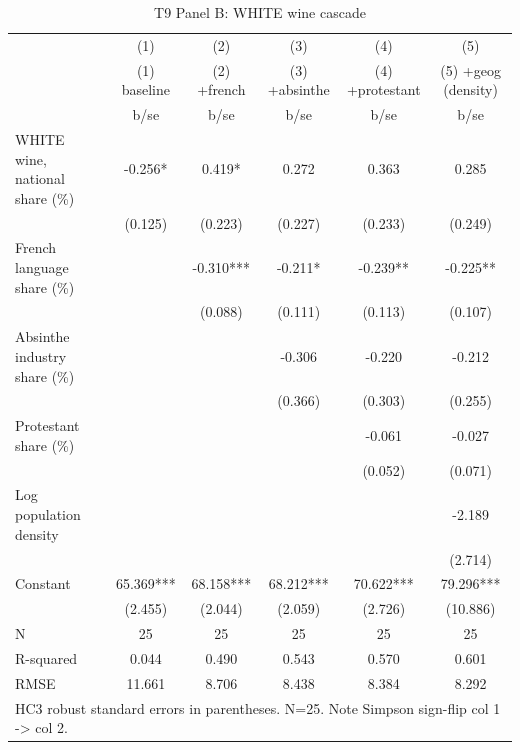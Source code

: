 \begin{table}[htbp]\centering
\def\sym#1{\ifmmode^{#1}\else\(^{#1}\)\fi}
\caption{T9 Panel B: WHITE wine cascade \label{tab:T9\_B}}
\begin{tabular}{l*{5}{c}}
\toprule
            &\multicolumn{1}{c}{(1)}&\multicolumn{1}{c}{(2)}&\multicolumn{1}{c}{(3)}&\multicolumn{1}{c}{(4)}&\multicolumn{1}{c}{(5)}\\
            &\multicolumn{1}{c}{(1) baseline}&\multicolumn{1}{c}{(2) +french}&\multicolumn{1}{c}{(3) +absinthe}&\multicolumn{1}{c}{(4) +protestant}&\multicolumn{1}{c}{(5) +geog (density)}\\
            &        b/se   &        b/se   &        b/se   &        b/se   &        b/se   \\
\midrule
WHITE wine, national share (\%)&      -0.256*  &       0.419*  &       0.272   &       0.363   &       0.285   \\
            &     (0.125)   &     (0.223)   &     (0.227)   &     (0.233)   &     (0.249)   \\
French language share (\%)&               &      -0.310***&      -0.211*  &      -0.239** &      -0.225** \\
            &               &     (0.088)   &     (0.111)   &     (0.113)   &     (0.107)   \\
Absinthe industry share (\%)&               &               &      -0.306   &      -0.220   &      -0.212   \\
            &               &               &     (0.366)   &     (0.303)   &     (0.255)   \\
Protestant share (\%)&               &               &               &      -0.061   &      -0.027   \\
            &               &               &               &     (0.052)   &     (0.071)   \\
Log population density&               &               &               &               &      -2.189   \\
            &               &               &               &               &     (2.714)   \\
Constant    &      65.369***&      68.158***&      68.212***&      70.622***&      79.296***\\
            &     (2.455)   &     (2.044)   &     (2.059)   &     (2.726)   &    (10.886)   \\
\midrule
N           &          25   &          25   &          25   &          25   &          25   \\
R-squared   &       0.044   &       0.490   &       0.543   &       0.570   &       0.601   \\
RMSE        &      11.661   &       8.706   &       8.438   &       8.384   &       8.292   \\
\bottomrule
\multicolumn{6}{l}{\footnotesize HC3 robust standard errors in parentheses.  N=25.  Note Simpson sign-flip col 1 -> col 2.}\\
\end{tabular}
\end{table}
